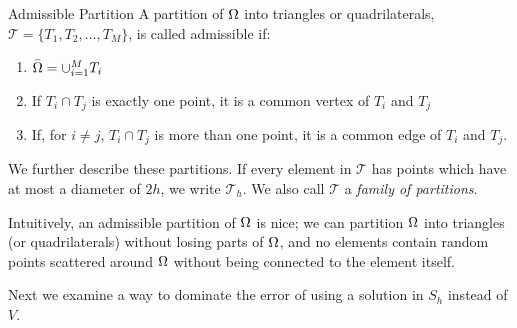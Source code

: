 
\begin{defn}{Admissible Partition}
   A partition of $\Omega$ into triangles or quadrilaterals, 
   $\mathcal{T} = \{T_1, T_2, \ldots, T_M \}$, is called admissible if:~\label{def:admissible_partition}
   \begin{enumerate}
    \item $ \bar{\Omega} = \cup_{i=1}^M T_i$
    \item If $T_i \cap T_j$ is exactly one point, it is a common vertex of 
    $T_i$ and $T_j$
    \item If, for $i\neq j$, $T_i \cap T_j$ is more than one point, it is a 
    common edge of $T_i$ and $T_j$.
   \end{enumerate}
\end{defn}
We further describe these partitions. If every element in $\mathcal{T}$ has points 
which have at most a diameter of $2h$, 
we write $\mathcal{T}_h$. We also call $\mathcal{T}$ a \emph{family of partitions}. 

Intuitively, an admissible partition of $\Omega$ is nice; we can partition $\Omega$ 
into triangles (or quadrilaterals) without losing parts of $\Omega$, and no 
elements contain random points scattered around $\Omega$ without being connected 
to the element itself.

Next we examine a way to dominate the error of using a solution in $S_h$ instead 
of $V$.